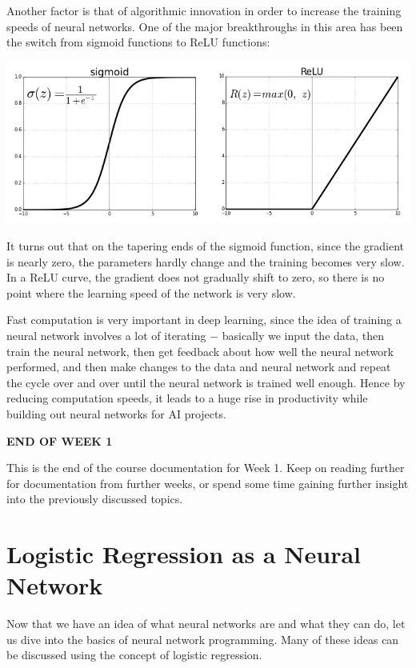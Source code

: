 \documentclass{article}[a4paper,12pt]
\theoremstyle{definition}
\begin{document}
Another factor is that of algorithmic innovation in order to increase the training speeds of neural networks. One of the major breakthroughs in this area has been the switch from sigmoid functions to ReLU functions:
\begin{center}\includegraphics[scale=0.5]{sigmoid_relu.png}\end{center}
It turns out that on the tapering ends of the sigmoid function, since the gradient is nearly zero, the parameters hardly change and the training becomes very slow. In a ReLU curve, the gradient does not gradually shift to zero, so there is no point where the learning speed of the network is very slow. 
\vspace{6pt}

Fast computation is very important in deep learning, since the idea of training a neural network involves a lot of iterating $-$ basically we input the data, then train the neural network, then get feedback about how well the neural network performed, and then make changes to the data and neural network and repeat the cycle over and over until the neural network is trained well enough. Hence by reducing computation speeds, it leads to a huge rise in productivity while building out neural networks for AI projects.

\hrulefill
\begin{center}\textbf{END OF WEEK 1}\end{center}
This is the end of the course documentation for Week 1. Keep on reading further for documentation from further weeks, or spend some time gaining further insight into the previously discussed topics.

\hrulefill
\pagebreak
\section{Logistic Regression as a Neural Network}
Now that we have an idea of what neural networks are and what they can do, let us dive into the basics of neural network programming. Many of these ideas can be discussed using the concept of logistic regression.
\vspace{6pt}
\end{document}
